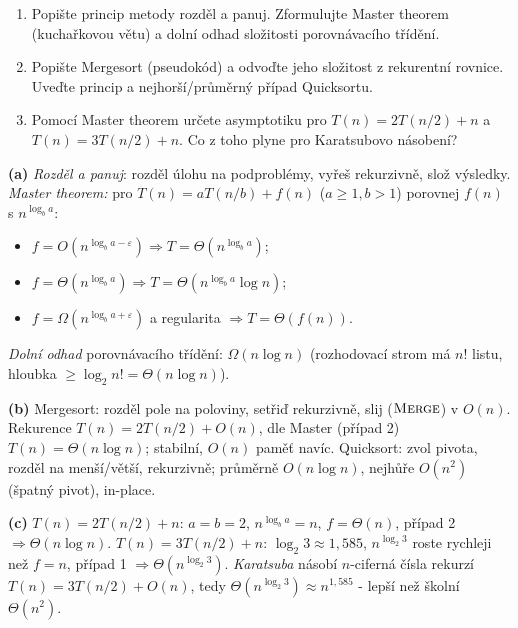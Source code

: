 \begin{zadani}
\begin{enumerate}[label=(\alph*)]
  \item {} Popište princip metody rozděl a panuj. Zformulujte Master theorem (kuchařkovou větu) a dolní odhad složitosti porovnávacího třídění.
  \item {} Popište Mergesort (pseudokód) a odvoďte jeho složitost z rekurentní rovnice. Uveďte princip a nejhorší/průměrný případ Quicksortu.
  \item {} Pomocí Master theorem určete asymptotiku pro $T(n)=2T(n/2)+n$ a $T(n)=3T(n/2)+n$. Co z toho plyne pro Karatsubovo násobení?
\end{enumerate}
\end{zadani}

\begin{reseni}
\textbf{(a)} \emph{Rozděl a panuj}: rozděl úlohu na podproblémy, vyřeš rekurzivně, slož výsledky. \emph{Master theorem:} pro $T(n)=aT(n/b)+f(n)$ ($a\ge1,b>1$) porovnej $f(n)$ s $n^{\log_b a}$:
\begin{itemize}\setlength\itemsep{0pt}
  \item $f=O(n^{\log_b a-\varepsilon})\Rightarrow T=\Theta(n^{\log_b a})$;
  \item $f=\Theta(n^{\log_b a})\Rightarrow T=\Theta(n^{\log_b a}\log n)$;
  \item $f=\Omega(n^{\log_b a+\varepsilon})$ a regularita $\Rightarrow T=\Theta(f(n))$.
\end{itemize}
\emph{Dolní odhad} porovnávacího třídění: $\Omega(n\log n)$ (rozhodovací strom má $n!$ listu, hloubka $\ge\log_2 n!=\Theta(n\log n)$).

\textbf{(b)} Mergesort: rozděl pole na poloviny, setřiď rekurzivně, slij ($\textsc{Merge}$) v $O(n)$. Rekurence $T(n)=2T(n/2)+O(n)$, dle Master (případ 2) $T(n)=\Theta(n\log n)$; stabilní, $O(n)$ paměť navíc. Quicksort: zvol pivota, rozděl na menší/větší, rekurzivně; průměrně $O(n\log n)$, nejhůře $O(n^2)$ (špatný pivot), in-place.

\textbf{(c)} $T(n)=2T(n/2)+n$: $a=b=2$, $n^{\log_b a}=n$, $f=\Theta(n)$, případ 2 $\Rightarrow \Theta(n\log n)$. $T(n)=3T(n/2)+n$: $\log_2 3\approx1{,}585$, $n^{\log_2 3}$ roste rychleji než $f=n$, případ 1 $\Rightarrow \Theta(n^{\log_2 3})$. \emph{Karatsuba} násobí $n$-ciferná čísla rekurzí $T(n)=3T(n/2)+O(n)$, tedy $\Theta(n^{\log_2 3})\approx n^{1{,}585}$ - lepší než školní $\Theta(n^2)$.
\end{reseni}

